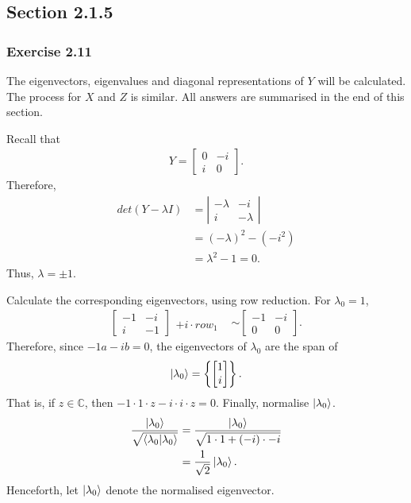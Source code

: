 \subsection{Section 2.1.5}
\subsubsection{Exercise 2.11}
\label{sec:nielsen-and-chuang-exercise-2-11}
The eigenvectors, eigenvalues and diagonal representations of $Y$ will be calculated.
The process for $X$ and $Z$ is similar.
All answers are summarised in the end of this section.

Recall that
\begin{align}
    Y = \left[ \begin{matrix}
            0 & -i \\
            i & 0
        \end{matrix} \right].
\end{align}
Therefore,
\begin{align}
    det(Y - \lambda I) &= \left| \begin{matrix}
            - \lambda & -i \\
            i & - \lambda
        \end{matrix} \right| \\
    &= (-\lambda)^2 - (- i^2) \\
    &= \lambda^2 -1 = 0 .
\end{align}
Thus, $\lambda = \pm 1$.

Calculate the corresponding eigenvectors, using row reduction.
For $\lambda_0 = 1$,
\begin{align}
    \left[ \begin{matrix}
        -1 & -i \\ i & -1
    \end{matrix} \right]
    \begin{matrix}
        ~ \\
        +i \cdot row_1
    \end{matrix}
    &\sim
    \left[ \begin{matrix}
        -1 & -i \\ 0 & 0
    \end{matrix} \right].
\end{align}
Therefore, since $-1a -ib = 0$,
the eigenvectors of $\lambda_0$ are the span of
\begin{align}
    \ket{\lambda_0} = \left\{ \left[ \begin{matrix} 1 \\ i \end{matrix} \right] \right\}.
\end{align}
That is, if $z \in \mathbb{C}$, then $-1 \cdot 1 \cdot z - i \cdot i \cdot z = 0$.
Finally, normalise $\ket{\lambda_0}$.
\begin{align}
    \frac{\ket{\lambda_0}}{\sqrt{\mathop{\mathinner{ \langle{\lambda_0}|{\lambda_0}\rangle}}}} &=
    \frac{\ket{\lambda_0}}{\sqrt{1\cdot 1 + (-i) \cdot -i}} \\
    &= \frac{1}{\sqrt2} \ket{\lambda_0}.
\end{align}
Henceforth, let $\ket{\lambda_0}$ denote the normalised eigenvector.

